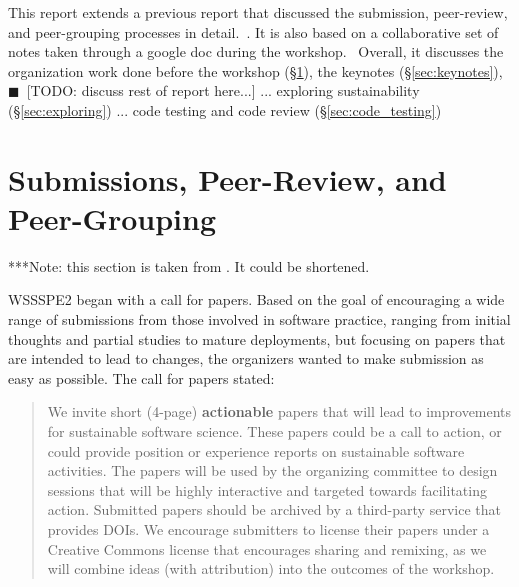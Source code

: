 \documentclass[11pt, oneside]{amsart}
\newcommand{\todo}[1]{{\color{blue}$\blacksquare$~\textsf{[TODO: #1]}}}
\newcommand{\note}[1]{ {\textcolor{blueish}    { ***Note:      #1 }}}
\begin{document}
This report extends a previous report that discussed the submission, peer-review, and peer-grouping processes in detail.~\cite{WSSSPE2-pre-report}.  It is also based on a collaborative set
of notes taken through a google doc during the workshop.~\cite{WSSSPE2-google-notes} 
Overall, it discusses the organization work done before the workshop (\S\ref{sec:preworkshop}), the keynotes (\S\ref{sec:keynotes}), \todo{discuss rest of report here...} ... exploring sustainability (\S\ref{sec:exploring}) ... code testing and code review (\S\ref{sec:code_testing})

\section{Submissions, Peer-Review, and Peer-Grouping} \label{sec:preworkshop}

\note{this section is taken from \cite{WSSSPE2-google-notes}. It could be shortened.}

WSSSPE2 began with a call for papers.
Based on the goal of encouraging a wide range of submissions from those involved
in software practice, ranging from initial thoughts and partial studies to
mature deployments, but focusing on papers that are intended to lead to changes,
the organizers wanted to make submission as easy as possible. The call for
papers stated:

\begin{quote}
We invite short (4-page) \textbf{actionable} papers that will lead to
improvements for sustainable software science. These papers could be a call to
action, or could provide position or experience reports on sustainable software
activities. The papers will be used by the organizing committee to design
sessions that will be highly interactive and targeted towards facilitating
action. Submitted papers should be archived by a third-party service that
provides DOIs. We encourage submitters to license their papers under a Creative
Commons license that encourages sharing and remixing, as we will combine ideas
(with attribution) into the outcomes of the workshop.
\end{quote}
\end{document}
